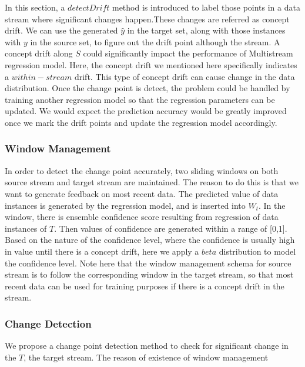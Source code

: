In this section, a $detectDrift$ method is introduced to label those 
points in a data stream where significant changes happen.These
changes are referred as concept drift.
We can use the generated $\hat{y}$ in the target set, along
with those instances with $y$ in the source set, to figure out 
the drift point although the stream. 
A concept drift along $S$ could significantly impact the performance of
Multistream regression model. Here, the concept drift we mentioned
here specifically indicates a $within-stream$ drift. This type
of concept drift can cause change in the data distribution. Once
the change point is detect, the problem could be handled by
training another regression model so that the regression
parameters can be updated. We would expect the prediction accuracy would be greatly improved once we mark the drift points and update the regression model accordingly.

\subsubsection{Window Management}
In order to detect the change point accurately, two
sliding windows on both source stream and target stream are
maintained. The reason to do this is that we want to generate
feedback on most recent data.
The predicted value of data instances is generated by the
regression model, and is inserted into $W_t$. In the window,
there is ensemble confidence score resulting from regression of
data instances of $T$. Then values of confidence are generated 
within a range of [0,1]. Based on the nature of the confidence
level, where the confidence is usually high in value until there 
is a concept drift, here we apply a $beta$ distribution to model the
confidence level. Note here that the window management schema for source 
stream is to follow the corresponding window in the target stream, so 
that most recent data can be used for training purposes if there is a 
concept drift in the stream.

\subsubsection{Change Detection}
We propose a change point detection method to check for
significant change in the $T$, the target stream. The reason of 
existence of window management



\makeatletter
\def\BState{\State\hskip-\ALG@thistlm}
\makeatother



